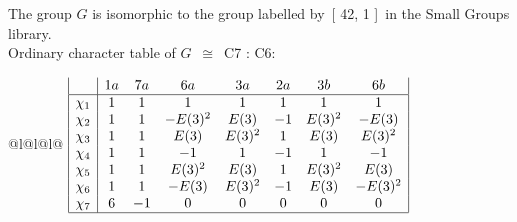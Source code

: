 \documentclass[varwidth=\maxdimen,border=10]{standalone}
\begin{document}
The group $G$ is isomorphic to the group labelled by\ [ 42, 1 ]\ in the Small Groups library.\\
Ordinary character table of $G$\ $\cong$\ C7 : C6:\\
\begin{center}
\begin{tabular}{@{}l@{}l@{}l@{}}
\hline
\(\begin{array}{|l|ccccccc|}
  & 1a & 7a & 6a & 3a & 2a & 3b & 6b\\ \hline
\chi_{1} & 1 & 1 & 1 & 1 & 1 & 1 & 1\\
\chi_{2} & 1 & 1 & -E(3)^{2} & E(3) & -1 & E(3)^{2} & -E(3)\\
\chi_{3} & 1 & 1 & E(3) & E(3)^{2} & 1 & E(3) & E(3)^{2}\\
\chi_{4} & 1 & 1 & -1 & 1 & -1 & 1 & -1\\
\chi_{5} & 1 & 1 & E(3)^{2} & E(3) & 1 & E(3)^{2} & E(3)\\
\chi_{6} & 1 & 1 & -E(3) & E(3)^{2} & -1 & E(3) & -E(3)^{2}\\
\chi_{7} & 6 & -1 & 0 & 0 & 0 & 0 & 0\\
\hline
\end{array}\)\\
\end{tabular}
\end{center}
\end{document}
